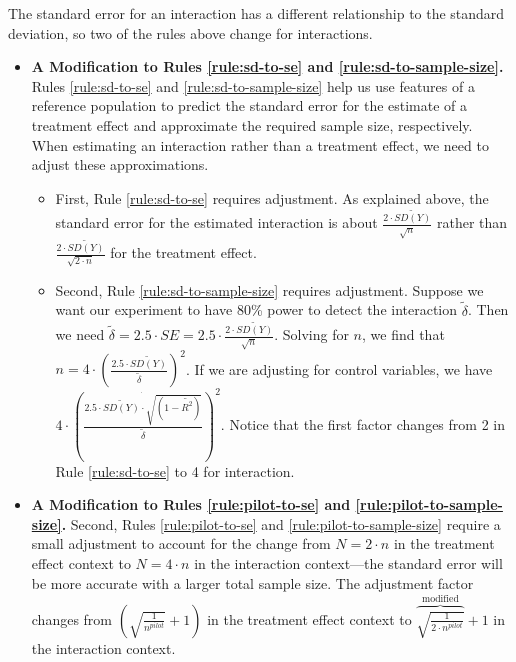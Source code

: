 \documentclass[12pt]{article}
\begin{document}
The standard error for an interaction has a different relationship to the standard deviation, so two of the rules above change for interactions.

\begin{itemize}
\item 
  \textbf{A Modification to Rules \ref{rule:sd-to-se} and \ref{rule:sd-to-sample-size}.} 
  Rules \ref{rule:sd-to-se} and \ref{rule:sd-to-sample-size} help us use features of a reference population to predict the standard error for the estimate of a treatment effect and approximate the required sample size, respectively. 
  When estimating an interaction rather than a treatment effect, we need to adjust these approximations. 
  \begin{itemize}
      \item   First, Rule \ref{rule:sd-to-se} requires adjustment. As explained above, the standard error for the estimated interaction is about $\frac{2 \cdot \widetilde{SD(Y)}}{\sqrt{n}}$ rather than $\frac{2 \cdot \widetilde{SD(Y)}}{\sqrt{2 \cdot n}}$ for the treatment effect.
      \item Second, Rule \ref{rule:sd-to-sample-size} requires adjustment. 
      Suppose we want our experiment to have 80\% power to detect the interaction $\widetilde{\delta}$. 
      Then we need $\widetilde{\delta} = 2.5 \cdot SE = 2.5 \cdot \frac{2 \cdot \widetilde{SD(Y)}}{\sqrt{n}}$. 
      Solving for $n$, we find that $n = 4 \cdot \left( \frac{2.5 \cdot \widetilde{SD(Y)}}{\widetilde{\delta}} \right)^{2}$. 
      If we are adjusting for control variables, we have $4 \cdot \left( \frac{\dot{2.5 \cdot \widetilde{SD(Y)} \cdot \sqrt{\left( 1 - \widetilde{R^{2}} \right)}}}{\widetilde{\delta}} \right)^{2}$. 
      Notice that the first factor changes from 2 in Rule \ref{rule:sd-to-se} to 4 for interaction. 
  \end{itemize}
\item \textbf{A Modification to Rules \ref{rule:pilot-to-se} and \ref{rule:pilot-to-sample-size}.} Second, Rules \ref{rule:pilot-to-se} and \ref{rule:pilot-to-sample-size} require a small adjustment to account for the change from $N = 2 \cdot n$ in the treatment effect context to $N = 4 \cdot n$ in the interaction context---the standard error will be more accurate with a larger total sample size. 
The adjustment factor changes from $\left( \sqrt{\frac{1}{n^{pilot}}} + 1 \right)$ in the treatment effect context to $\overset{\text{modified}}{\overbrace{\sqrt{\frac{1}{2 \cdot n^{pilot}}}}} + 1$ in the interaction context.
\end{itemize}
\end{document}
